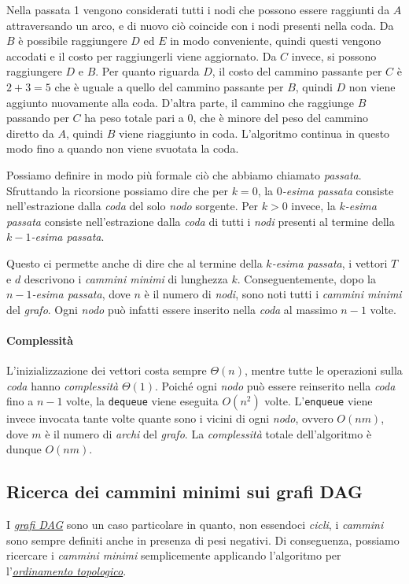 \begin{eg}
Nella passata 1 vengono considerati tutti i nodi che possono essere raggiunti da
$A$ attraversando un arco, e di nuovo ciò coincide con i nodi presenti nella coda.
Da $B$ è possibile raggiungere $D$ ed $E$ in modo conveniente, quindi questi
vengono accodati e il costo per raggiungerli viene aggiornato. Da $C$ invece, si
possono raggiungere $D$ e $B$. Per quanto riguarda $D$, il costo del cammino
passante per $C$ è $2+3=5$ che è uguale a quello del cammino passante per $B$,
quindi $D$ non viene aggiunto nuovamente alla coda. D'altra parte, il cammino
che raggiunge $B$ passando per $C$ ha peso totale pari a 0, che è minore del
peso del cammino diretto da $A$, quindi $B$ viene riaggiunto in coda.
L'algoritmo continua in questo modo fino a quando non viene svuotata la coda.
\end{eg}

\noindent
Possiamo definire in modo più formale ciò che abbiamo chiamato \emph{passata}.
Sfruttando la ricorsione possiamo dire che per $k=0$, la \emph{$0$-esima passata}
consiste nell'estrazione dalla \emph{coda} del solo \emph{nodo} sorgente.
Per $k>0$ invece, la \emph{$k$-esima passata} consiste nell'estrazione dalla
\emph{coda} di tutti i \emph{nodi} presenti al termine della \emph{$k-1$-esima
passata}.

Questo ci permette anche di dire che al termine della \emph{$k$-esima passata},
i vettori $T$ e $d$ descrivono i \emph{cammini minimi} di lunghezza $k$.
Conseguentemente, dopo la \emph{$n-1$-esima passata}, dove $n$ è il
numero di \emph{nodi}, sono noti tutti i \emph{cammini minimi} del \emph{grafo}.
Ogni \emph{nodo} può infatti essere inserito nella \emph{coda} al massimo $n-1$
volte.

\paragraph{Complessità}
L'inizializzazione dei vettori costa sempre $\Theta(n)$, mentre tutte le
operazioni sulla \emph{coda} hanno \emph{complessità} $\Theta(1)$. Poiché ogni
\emph{nodo} può essere reinserito nella \emph{coda} fino a $n-1$ volte, la
\texttt{dequeue} viene eseguita $O(n^2)$ volte. L'\texttt{enqueue} viene invece
invocata tante volte quante sono i vicini di ogni \emph{nodo}, ovvero
$O(nm)$, dove $m$ è il numero di \emph{archi} del \emph{grafo}. La
\emph{complessità} totale dell'algoritmo è dunque $O(nm)$.

\subsection{Ricerca dei cammini minimi sui grafi DAG}
I \emph{\hyperref[def:79]{grafi DAG}} sono un caso particolare in quanto, non
essendoci \emph{cicli}, i \emph{cammini} sono sempre definiti anche in presenza
di pesi negativi. Di conseguenza, possiamo ricercare i \emph{cammini minimi}
semplicemente applicando l'algoritmo per l'\emph{\hyperref[def:83]{ordinamento
topologico}}.


